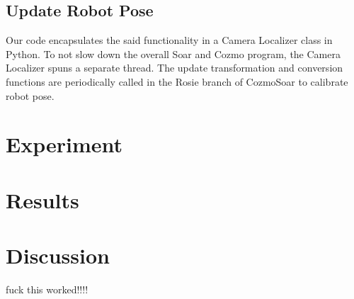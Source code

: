 \documentclass[jou,apacite]{apa6}
\begin{document}
\subsection{Update Robot Pose}
Our code encapsulates the said functionality in a Camera Localizer class in Python. To not slow down the overall Soar and Cozmo program, the Camera Localizer spuns a separate thread. The update transformation and conversion functions are periodically called in the Rosie branch of CozmoSoar to calibrate robot pose. 

\section{Experiment}


\section{Results}


\section{Discussion}
fuck this worked!!!!\cite{Pan}

\end{document}
